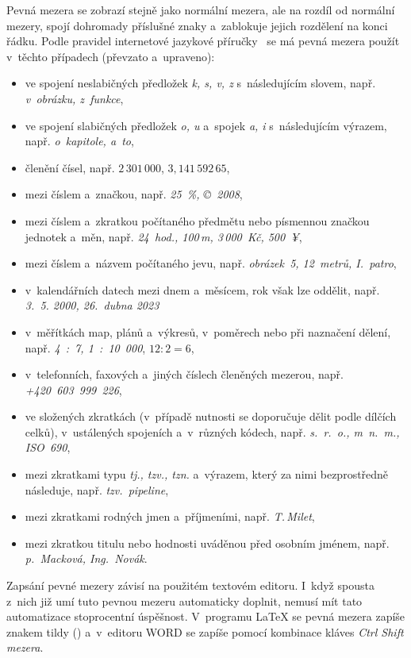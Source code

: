 Pevná mezera se zobrazí stejně jako normální mezera, ale na rozdíl od normální
mezery, spojí dohromady příslušné znaky a~zablokuje jejich rozdělení na konci
řádku. Podle pravidel internetové jazykové příručky~\cite[Sekce: \emph{Zalomení řádků a~nevhodné výrazy na jejich konci}]{Ustav_pro_jazyk_cesky}
se má pevná mezera použít v~těchto případech (převzato a~upraveno):
\begin{itemize}
    \item ve spojení neslabičných předložek \emph{k, s, v, z} s~následujícím
    slovem, např. \emph{v~obrázku, z~funkce},
    \item ve spojení slabičných předložek \emph{o, u} a~spojek \emph{a, i}
    s~následujícím výrazem, např. \emph{o~kapitole, a~to},
    \item členění čísel, např. $\mathit{2\,301\,000}$, $\mathit{3,\!141\,592\,65}$,
    \item mezi číslem a~značkou, např. \emph{25~\%, \copyright~2008},
    \item mezi číslem a~zkratkou počítaného předmětu nebo písmennou značkou
    jednotek a~měn, např. \emph{24~hod., 100\,m, 3\,000~Kč, 500~¥},
    \item mezi číslem a~názvem počítaného jevu, např. \emph{obrázek~5, 12~metrů,
    I.~patro},
    \item v~kalendářních datech mezi dnem a~měsícem, rok však lze oddělit, např.
    \emph{3.~5. 2000, 26.~dubna 2023}
    \item v~měřítkách map, plánů a~výkresů, v~poměrech nebo při naznačení dělení,
    např. \emph{4~:~7, 1~:~10~000}, $\mathit{12:2=6}$,
    \item v~telefonních, faxových a~jiných číslech členěných mezerou, např. 
    \emph{+420~603~999~226},
    \item ve složených zkratkách (v~případě nutnosti se doporučuje dělit podle
    dílčích celků), v~ustálených spojeních a~v~různých kódech, např.
    \emph{s.~r.~o., m~n.~m., ISO~690},
    \item mezi zkratkami typu \emph{tj., tzv., tzn.} a~výrazem, který za nimi
    bezprostředně následuje, např. \emph{tzv.~pipeline},
    \item mezi zkratkami rodných jmen a~příjmeními, např. \emph{T.\,Milet},
    \item mezi zkratkou titulu nebo hodnosti uváděnou před osobním jménem, např.
    \emph{p.~Macková, Ing.~Novák}.
\end{itemize}

Zapsání pevné mezery závisí na použitém textovém editoru. I~když spousta z~nich
již umí tuto pevnou mezeru automaticky doplnit, nemusí mít tato automatizace
stoprocentní úspěšnost. V~programu {\LaTeX} se pevná mezera zapíše znakem tildy
(\texttildelow) a~v~editoru WORD se zapíše pomocí kombinace kláves
\emph{Ctrl Shift mezera}.

